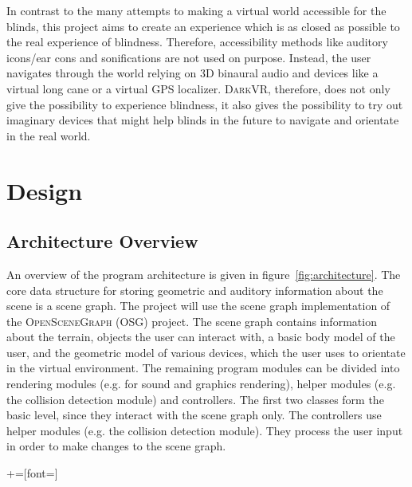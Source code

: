 \documentclass{article}
\newcommand{\darkvr}{\textsc{DarkVR}\xspace}
\begin{document}
In contrast to the many attempts to making a virtual world accessible for the
blinds, this project aims to create an experience which is as closed as
possible to the real experience of blindness. Therefore, accessibility methods
like auditory icons/ear cons and sonifications are not used on purpose. Instead,
the user navigates through the world relying on 3D binaural audio and devices
like a virtual long cane or a virtual GPS localizer. \darkvr, therefore,
does not only give the possibility to experience blindness, it also gives the
possibility to try out imaginary devices that might help blinds in the
future to navigate and orientate in the real world.

\section{Design}

\subsection{Architecture Overview}

An overview of the program architecture is given in
figure~\ref{fig:architecture}. The core data structure for storing geometric and
auditory information about the scene is a scene graph. The project will use the
scene graph implementation of the \textsc{OpenSceneGraph} (OSG)
project\cite{osg}. The scene graph contains information about the terrain,
objects the user can interact with, a basic body model of the user, and the
geometric model of various devices, which the user uses to orientate in the
virtual environment. The remaining program modules can be divided into rendering
modules (e.g. for sound and graphics rendering), helper modules (e.g. the
collision detection module) and controllers. The first two classes form the
basic level, since they interact with the scene graph only. The controllers use
helper modules (e.g. the collision detection module). They process the user
input in order to make changes to the scene graph.

+=[font=\sffamily]
\end{document}
